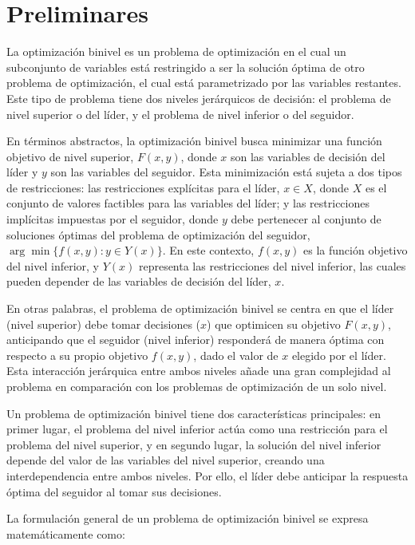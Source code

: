 \chapter{Preliminares}

La optimización binivel es un problema de optimización en el cual un subconjunto de variables está restringido a ser la solución óptima de otro problema de optimización, el cual está parametrizado por las variables restantes. Este tipo de problema tiene dos niveles jerárquicos de decisión: el problema de nivel superior o del líder, y el problema de nivel inferior o del seguidor. 

En términos abstractos, la optimización binivel busca minimizar una función objetivo de nivel superior, $F(x, y)$, donde $x$ son las variables de decisión del líder y $y$ son las variables del seguidor. Esta minimización está sujeta a dos tipos de restricciones: las restricciones explícitas para el líder, $x \in X$, donde $X$ es el conjunto de valores factibles para las variables del líder; y las restricciones implícitas impuestas por el seguidor, donde $y$ debe pertenecer al conjunto de soluciones óptimas del problema de optimización del seguidor, $\arg\min\{f(x, y) : y \in Y(x)\}$. En este contexto, $f(x, y)$ es la función objetivo del nivel inferior, y $Y(x)$ representa las restricciones del nivel inferior, las cuales pueden depender de las variables de decisión del líder, $x$.

En otras palabras, el problema de optimización binivel se centra en que el líder (nivel superior) debe tomar decisiones ($x$) que optimicen su objetivo $F(x, y)$, anticipando que el seguidor (nivel inferior) responderá de manera óptima con respecto a su propio objetivo $f(x, y)$, dado el valor de $x$ elegido por el líder. Esta interacción jerárquica entre ambos niveles añade una gran complejidad al problema en comparación con los problemas de optimización de un solo nivel.

Un problema de optimización binivel tiene dos características principales: en primer lugar, el problema del nivel inferior actúa como una restricción para el problema del nivel superior, y en segundo lugar, la solución del nivel inferior depende del valor de las variables del nivel superior, creando una interdependencia entre ambos niveles. Por ello, el líder debe anticipar la respuesta óptima del seguidor al tomar sus decisiones.

La formulación general de un problema de optimización binivel se expresa matemáticamente como:  

